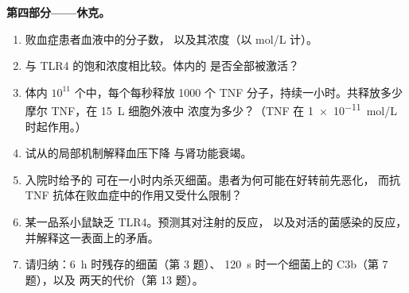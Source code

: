 \begin{problem}
\medskip
\noindent\textbf{第四部分——休克。}
\begin{enumerate}[resume]
  \item 败血症患者血液中的分子数，
        以及其浓度（以 mol/L 计）。
  \item 与 TLR4 的饱和浓度相比较。体内的
        是否全部被激活？
  \item 体内 $10^{11}$ 个中，每个每秒释放 \num{1000} 个 TNF
        分子，持续一小时。共释放多少摩尔 TNF，在 \qty{15}{L} 细胞外液中
        浓度为多少？（TNF 在
        \qty{1e-11}{mol/L} 时起作用。）
  \item 试从的局部机制解释血压下降
        与肾功能衰竭。
  \item 入院时给予的
        可在一小时内杀灭细菌。患者为何可能在好转前先恶化，
        而抗 TNF 抗体在败血症中的作用又受什么限制？
  \item 某一品系小鼠缺乏 TLR4。预测其对注射的反应，
        以及对活的菌感染的反应，
        并解释这一表面上的矛盾。
  \item 请归纳：\qty{6}{h} 时残存的细菌（第 3 题）、
        \qty{120}{s} 时一个细菌上的 C3b（第 7 题），以及
        两天的代价（第 13 题）。
\end{enumerate}
\end{problem}
